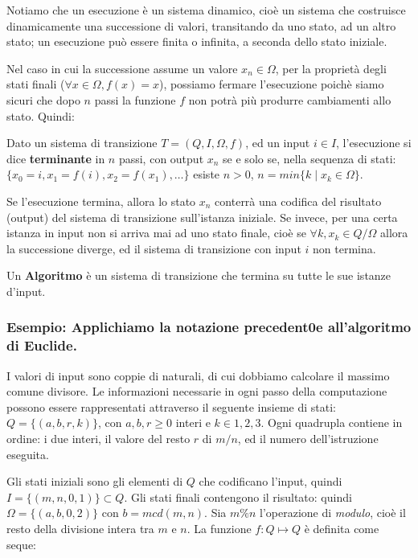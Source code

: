 Notiamo che un esecuzione è un sistema dinamico, cioè un sistema che costruisce dinamicamente una successione di valori, transitando da uno stato, ad un altro stato; un esecuzione può essere
finita o infinita, a seconda dello stato iniziale.

Nel caso in cui la successione assume un valore $x_n  \in \Omega$, per la proprietà degli stati finali ($\forall x \in \Omega, f(x) = x$), possiamo fermare l'esecuzione poichè siamo sicuri che dopo $n$ passi la funzione $f$ non potrà più produrre cambiamenti allo stato. Quindi:

\begin{defn} Dato un sistema di transizione $T = (Q,I,\Omega,f)$, ed
  un input $i \in I$, l'esecuzione si dice \textbf{terminante} in $n$
  passi, con output $x_n$ se e solo se, nella sequenza di stati: $\{
  x_0 = i, x_1 = f(i), x_2 = f(x_1), \ldots \}$ esiste $n>0$, $n = min
  \{ k\; |\; x_k \in \Omega \}$.
\end{defn}

Se l'esecuzione termina, allora lo stato $x_n$ conterrà una codifica del risultato (output) del sistema di transizione sull'istanza iniziale. Se invece, per una certa istanza in input non si arriva mai ad uno stato finale, cioè se $\forall k, x_k \in Q/\Omega$ allora la successione diverge, ed il sistema di transizione con input $i$ non termina.

\begin{defn}
Un \textbf{Algoritmo} è un sistema di transizione che termina su tutte le sue
istanze d'input.
\end{defn}


\subsubsection{Esempio: Applichiamo la notazione precedent0e all'algoritmo di Euclide.}

I valori di input sono coppie di naturali, di cui dobbiamo calcolare il massimo comune divisore. Le informazioni necessarie in ogni passo della computazione possono essere rappresentati attraverso il seguente insieme di stati: $Q = \{ (a,b,r,k) \}$, con $a,b,r \geq 0$ interi e $k \in {1,2,3}$.  Ogni quadrupla contiene in ordine: i due interi, il valore del resto $r$ di $m/n$, ed il numero dell'istruzione eseguita.

Gli stati iniziali sono gli elementi di $Q$ che codificano l'input, quindi $I = \{ (m,n,0,1) \} \subset Q$. Gli stati finali contengono il risultato: quindi $\Omega = \{ (a,b,0,2) \}$ con $b = mcd(m,n)$.  Sia $m \% n$ l'operazione di \emph{modulo}, cioè il resto della divisione intera tra $m$ e $n$.  La funzione $f: Q \mapsto Q$ è definita come seque:

